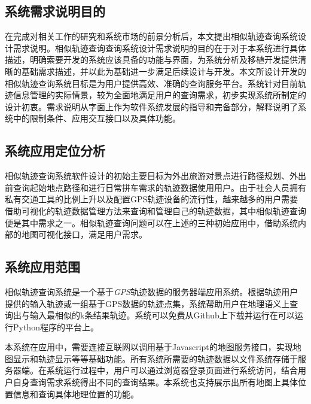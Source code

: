 \subsection{系统需求说明目的}
\label{subsec:propose}
在完成对相关工作的研究和系统市场的前景分析后，本文提出相似轨迹查询系统设计需求说明。相似轨迹查询查询系统设计需求说明的目的在于对于本系统进行具体描述，明确索要开发的系统应该具备的功能与界面，为系统分析及移植开发提供清晰的基础需求描述，并以此为基础进一步满足后续设计与开发。本文所设计开发的相似轨迹查询系统目标是为用户提供高效、准确的查询服务平台。系统针对目前轨迹信息管理的实际情景，较为全面地满足用户的查询需求，初步实现系统所制定的设计初衷。需求说明从字面上作为软件系统发展的指导和完备部分，解释说明了系统中的限制条件、应用交互接口以及具体功能。

\subsection{系统应用定位分析}
\label{subsec:system orientation}
相似轨迹查询系统软件设计的初始主要目标为外出旅游对景点进行路径规划、外出前查询起始地点路径和进行日常拼车需求的轨迹数据使用用户。由于社会人员拥有私有交通工具的比例上升以及配置GPS轨迹设备的流行性，越来越多的用户需要借助可视化的轨迹数据管理方法来查询和管理自己的轨迹数据，其中相似轨迹查询便是其中需求之一。相似轨迹查询问题可以在上述的三种初始应用中，借助系统内部的地图可视化接口，满足用户需求。

\subsection{系统应用范围}
\label{subsec:scope}
相似轨迹查询系统是一个基于\emph{GPS}轨迹数据的服务器端应用系统。根据轨迹用户提供的输入轨迹或一组基于GPS数据的轨迹点集，系统帮助用户在地理语义上查询出与输入最相似的k条结果轨迹。系统可以免费从Github上下载并运行在可以运行Python程序的平台上。

本系统在应用中，需要连接互联网以调用基于Javascript的地图服务接口，实现地图显示和轨迹显示等等基础功能。所有系统所需要的轨迹数据以文件系统存储于服务器端。在系统运行过程中，用户可以通过浏览器登录页面进行系统访问，结合用户自身查询需求系统得出不同的查询结果。本系统也支持展示出所有地图上具体位置信息和查询具体地理位置的功能。

